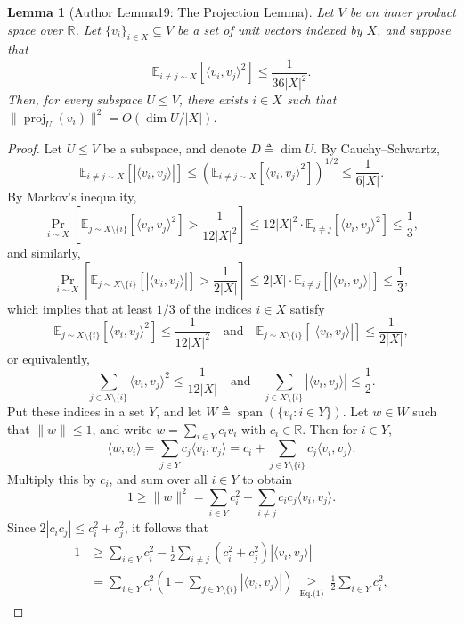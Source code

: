 \documentclass[10pt,a4paper]{article}
\newtheorem{ntlemma}[nttheorem]{Lemma}
\begin{document}
\setcounter{nttheorem}{18}
\begin{ntlemma}[Author Lemma19: The Projection Lemma]
Let $V$ be an inner product space over $\mathbb R$. Let $\{v_i\}_{i\in X}\subseteq V$ be a set of unit vectors indexed by $X$, and suppose that
\[\mathbb E_{i\ne j\sim X}[\langle v_i,v_j\rangle^2]\leq\frac1{36|X|^2}.\]
Then, for every subspace $U\leq V$, there exists $i\in X$ such that $\|\operatorname{proj}_U(v_i)\|^2=O(\dim U/|X|)$.
\end{ntlemma}
\begin{proof}
Let $U\leq V$ be a subspace, and denote $D\triangleq\dim U$.
By Cauchy--Schwartz,
\[\mathbb E_{i\ne j\sim X}[|\langle v_i,v_j\rangle|]\leq\left(\mathbb E_{i\ne j\sim X}[\langle v_i,v_j\rangle^2]\right)^{1/2}\leq\frac1{6|X|}.\]
By Markov's inequality,
\[\Pr_{i\sim X}\left[\mathbb E_{j\sim X\setminus\{i\}}[\langle v_i,v_j\rangle^2]>\frac1{12|X|^2}\right]\leq12|X|^2\cdot\mathbb E_{i\ne j}[\langle v_i,v_j\rangle^2]\leq\frac13,\]
and similarly,
\[\Pr_{i\sim X}\left[\mathbb E_{j\sim X\setminus\{i\}}[|\langle v_i,v_j\rangle|]>\frac1{2|X|}\right]\leq2|X|\cdot\mathbb E_{i\ne j}[|\langle v_i,v_j\rangle|]\leq\frac13,\]
which implies that at least $1/3$ of the indices $i\in X$ satisfy
\[\mathbb E_{j\sim X\setminus\{i\}}[\langle v_i,v_j\rangle^2]\leq\frac1{12|X|^2}\quad\text{and}\quad\mathbb E_{j\sim X\setminus\{i\}}[|\langle v_i,v_j\rangle|]\leq\frac1{2|X|},\]
or equivalently,
\begin{equation}\sum_{j\in X\setminus\{i\}}\langle v_i,v_j\rangle^2\leq\frac1{12|X|}\quad\text{and}\quad\sum_{j\in X\setminus\{i\}}|\langle v_i,v_j\rangle|\leq\frac12.\tag{1}\end{equation}
Put these indices in a set $Y$, and let $W\triangleq\operatorname{span}(\{v_i:i\in Y\})$.
Let $w\in W$ such that $\|w\|\leq1$, and write $w=\sum_{i\in Y}c_iv_i$ with $c_i\in\mathbb R$. Then for $i\in Y$,
\[\langle w,v_i\rangle=\sum_{j\in Y}c_j\langle v_i,v_j\rangle=c_i+\sum_{j\in Y\setminus\{i\}}c_j\langle v_i,v_j\rangle.\]
Multiply this by $c_i$, and sum over all $i\in Y$ to obtain
\[1\geq\|w\|^2=\sum_{i\in Y}c_i^2+\sum_{i\ne j}c_ic_j\langle v_i,v_j\rangle.\]
Since $2|c_ic_j|\leq c_i^2+c_j^2$, it follows that
\begin{align*}1&\geq\sum_{i\in Y}c_i^2-\frac12\sum_{i\ne j}(c_i^2+c_j^2)|\langle v_i,v_j\rangle|\\&=\sum_{i\in Y}c_i^2\left(1-\sum_{j\in Y\setminus\{i\}}|\langle v_i,v_j\rangle|\right)\ \underset{\text{Eq.(1)}}\geq\ \frac12\sum_{i\in Y}c_i^2,\end{align*}

\end{proof}
\end{document}
